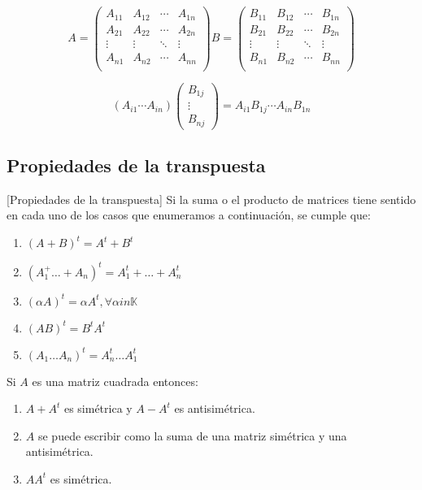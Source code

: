 \[
A=\left(\begin{array}{c|c|c|c}
A_{11} & A_{12} & \cdots & A_{1n}  \\
\hline
A_{21} & A_{22} & \cdots & A_{2n}  \\
\hline
\vdots & \vdots & \ddots & \vdots  \\
\hline
A_{n1} & A_{n2} & \cdots & A_{nn}  \\
\end{array}\right)
B=\left(\begin{array}{c|c|c|c}
B_{11} & B_{12} & \cdots & B_{1n}  \\
\hline
B_{21} & B_{22} & \cdots & B_{2n}  \\
\hline
\vdots & \vdots & \ddots & \vdots  \\
\hline
B_{n1} & B_{n2} & \cdots & B_{nn}  \\
\end{array}\right)
\]

\[
(A_{i1} \cdots A_{in})
\left(\begin{array}{c}
B_{1j} \\ \vdots \\ B_{nj}
\end{array}\right) = A_{i1}B_{1j} \cdots A_{in}B_{1n}
\]

\subsection{Propiedades de la transpuesta}

[Propiedades de la transpuesta]
  Si la suma o el producto de matrices tiene sentido en cada uno de los casos que enumeramos a continuación, se cumple que:
  \begin{enumerate}
   \item $(A+B)^t=A^t+B^t$
   \item $(A_1^+\ldots+A_n)^t=A_1^t+\ldots+A_n^t$
   \item $(\alpha A)^t=\alpha A^t, \forall \alpha in \mathbb{K}$
   \item $(AB)^t=B^tA^t$
   \item $(A_1\ldots A_n)^t = A_n^t \ldots A_1^t$
\end{enumerate}



 Si $A$ es una matriz cuadrada entonces:
 \begin{enumerate}
  \item $A+A^t$ es simétrica y $A-A^t$ es antisimétrica.
  \item $A$ se puede escribir como la suma de una matriz simétrica y una antisimétrica.
  \item $AA^t$ es simétrica.
 \end{enumerate}


